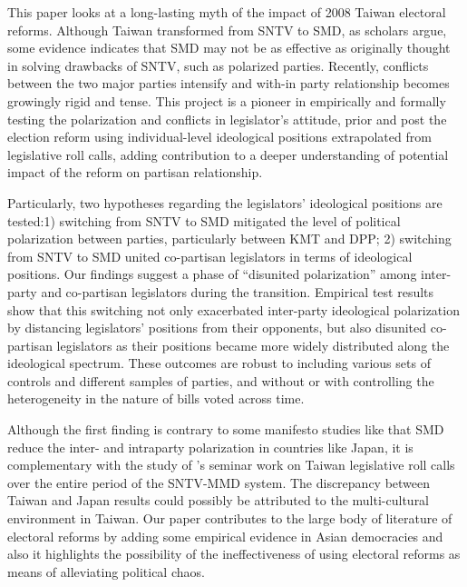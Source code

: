 This paper looks at a long-lasting myth of the impact of 2008 Taiwan electoral reforms. Although Taiwan transformed from SNTV to SMD, as scholars argue, some evidence indicates that SMD may not be as effective as originally thought in solving drawbacks of SNTV, such as polarized parties. Recently, conflicts between the two major parties
intensify and with-in party relationship becomes growingly rigid and tense. This project is a pioneer in empirically and formally testing the polarization and conflicts in legislator's attitude, prior and post the election reform using individual-level ideological positions extrapolated from legislative roll calls, adding contribution to a deeper understanding of potential impact of the reform on partisan relationship. 

Particularly, two hypotheses regarding the legislators' ideological positions are tested:1) switching from SNTV to SMD mitigated the level of political polarization between parties, particularly between
KMT and DPP; 2) switching from SNTV to SMD united co-partisan legislators in terms of ideological positions. Our findings suggest a phase of ``disunited polarization'' among inter-party and co-partisan legislators during the transition. Empirical test results show that this switching not only exacerbated inter-party ideological polarization by distancing legislators' positions from their opponents, but also disunited co-partisan legislators as their positions became more widely distributed along the ideological spectrum. These outcomes are robust to including various sets of controls and different samples of parties, and without or with controlling the heterogeneity in the nature of bills voted across time.

Although the first finding is contrary to some manifesto studies like \citet{Catalinac2017} that SMD reduce the inter- and intraparty polarization in countries like Japan, it is complementary with the study of \citet{Jang2019}'s seminar work on Taiwan legislative roll calls over the entire period of the SNTV-MMD system. The discrepancy between Taiwan and Japan results could possibly be attributed to the
multi-cultural environment in Taiwan. Our paper contributes to the large body of literature of electoral reforms by adding some empirical evidence in Asian democracies and also it highlights the possibility of the ineffectiveness of using electoral reforms as means of alleviating political chaos.